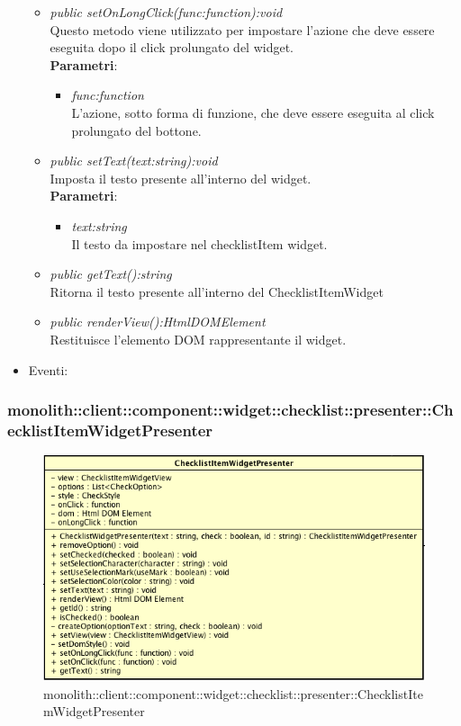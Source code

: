 \begin{itemize}
\begin{itemize}
	\item \textit{public setOnLongClick(func:function):void}\\
		Questo metodo viene utilizzato per impostare l'azione che deve essere eseguita dopo il click prolungato del widget.
		\\ \textbf{Parametri}: \begin{itemize}
		\item \textit{func:function}\\
		L'azione, sotto forma di funzione, che deve essere eseguita al click prolungato del bottone.
		\end{itemize}
	\item \textit{public setText(text:string):void}\\
	Imposta il testo presente all'interno del widget.
		\\ \textbf{Parametri}: \begin{itemize}
		\item \textit{text:string}\\
		Il testo da impostare nel checklistItem widget.
		\end{itemize}
	\item \textit{public getText():string}\\
	Ritorna il testo presente all'interno del ChecklistItemWidget
	\item \textit{public renderView():HtmlDOMElement}\\
	Restituisce l'elemento DOM rappresentante il widget.
	\end{itemize}
\item{Eventi}:
\end{itemize}

\subsubsection{monolith::client::component::widget::checklist::presenter::ChecklistItemWidgetPresenter}

\label{monolith::client::component::widget::checklist::presenter::ChecklistItemWidgetPresenter}
\begin{figure}[H]
	\centering
	\includegraphics[scale=0.5]{Sezioni/SottosezioniST/img/ChecklistItemWidgetPresenter.png}
	\caption{monolith::client::component::widget::checklist::presenter::ChecklistItemWidgetPresenter}
\end{figure}

